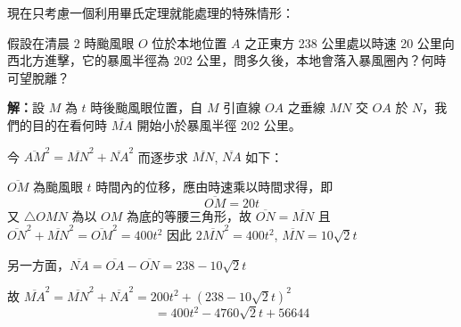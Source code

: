 現在只考慮一個利用畢氏定理就能處理的特殊情形：

假設在清晨 2 時颱風眼 $O$ 位於本地位置 $A$ 之正東方 238 公里處以時速 20 公里向西北方進擊，它的暴風半徑為 202 公里，問多久後，本地會落入暴風圈內？何時可望脫離？

\noindent\textbf{解：}設 $M$ 為 $t$ 時後颱風眼位置，自 $M$ 引直線 $OA$ 之垂線 $MN$ 交 $OA$ 於 $N$，我們的目的在看何時 $\overline{MA}$ 開始小於暴風半徑 202 公里。

今 $\overline{AM}^2 = \overline{MN}^2 + \overline{NA}^2$ 而逐步求 $\overline{MN}$, $\overline{NA}$ 如下：

$\overline{OM}$ 為颱風眼 $t$ 時間內的位移，應由時速乘以時間求得，即
\[ \overline{OM} = 20t \]
又 $\triangle OMN$ 為以 $OM$ 為底的等腰三角形，故 $\overline{ON} = \overline{MN}$ 且 $\overline{ON}^2 + \overline{MN}^2 = \overline{OM}^2 = 400t^2$
因此 $2\overline{MN}^2 = 400t^2$, $\overline{MN} = 10\sqrt{2}t$

另一方面，$\overline{NA} = \overline{OA} - \overline{ON} = 238 - 10\sqrt{2}t$

故 $\overline{MA}^2 = \overline{MN}^2 + \overline{NA}^2 = 200t^2 + (238 - 10\sqrt{2}t)^2$
\[ = 400t^2 - 4760\sqrt{2}t + 56644 \]

